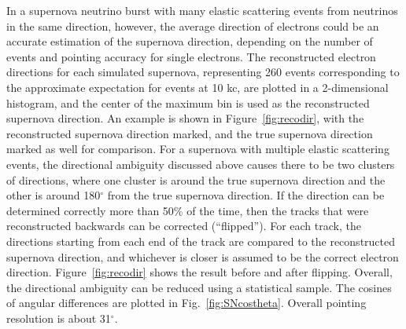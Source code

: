 In a supernova neutrino burst with many elastic scattering events from neutrinos in the same direction, however, the average direction of electrons could be an accurate estimation of the supernova direction, depending on the number of events and pointing accuracy for single electrons.
The reconstructed electron directions for each simulated supernova,
representing 260 events corresponding to the approximate expectation
for  events at 10 kc, are plotted in a 2-dimensional histogram, and
the center of the maximum bin is used as the reconstructed supernova
direction. An example is shown in Figure~\ref{fig:recodir}, with the
reconstructed supernova direction marked, and the true supernova
direction marked as well for comparison.
For a supernova with multiple elastic scattering events, the
directional ambiguity discussed above causes there to be two clusters
of directions, where one cluster is around the true supernova
direction and the other is around 180$^{\circ}$ from the true
supernova direction.
If the direction can be determined correctly more than 50\% of the
time, then the tracks that were reconstructed backwards can be
corrected (``flipped''). For each track, the directions starting from
each end of the track are compared to the reconstructed supernova
direction, and whichever is closer is assumed to be the correct
electron direction.  Figure~\ref{fig:recodir} shows the result before
and after flipping.
Overall, the directional
ambiguity can be reduced using a statistical sample.
The cosines of angular differences are plotted in
Fig.~\ref{fig:SNcostheta}.    Overall pointing resolution is about 31$^\circ$.



